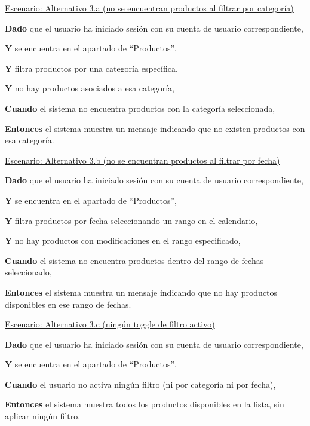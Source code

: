 
\underline{Escenario: Alternativo 3.a (no se encuentran productos al filtrar por categoría)}\par
\vspace{0.15cm}
\textbf{Dado} que el usuario ha iniciado sesión con su cuenta de usuario correspondiente,\par
\textbf{Y} se encuentra en el apartado de \enquote{Productos},\par
\textbf{Y} filtra productos por una categoría específica,\par
\textbf{Y} no hay productos asociados a esa categoría,\par
\textbf{Cuando} el sistema no encuentra productos con la categoría seleccionada,\par
\textbf{Entonces} el sistema muestra un mensaje indicando que no existen productos con esa categoría.\par

\vspace{0.20cm}

\underline{Escenario: Alternativo 3.b (no se encuentran productos al filtrar por fecha)}\par
\vspace{0.15cm}
\textbf{Dado} que el usuario ha iniciado sesión con su cuenta de usuario correspondiente,\par
\textbf{Y} se encuentra en el apartado de \enquote{Productos},\par
\textbf{Y} filtra productos por fecha seleccionando un rango en el calendario,\par
\textbf{Y} no hay productos con modificaciones en el rango especificado,\par
\textbf{Cuando} el sistema no encuentra productos dentro del rango de fechas seleccionado,\par
\textbf{Entonces} el sistema muestra un mensaje indicando que no hay productos disponibles en ese rango de fechas.\par

\vspace{0.20cm}

\underline{Escenario: Alternativo 3.c (ningún toggle de filtro activo)}\par
\vspace{0.15cm}
\textbf{Dado} que el usuario ha iniciado sesión con su cuenta de usuario correspondiente,\par
\textbf{Y} se encuentra en el apartado de \enquote{Productos},\par
\textbf{Cuando} el usuario no activa ningún filtro (ni por categoría ni por fecha),\par
\textbf{Entonces} el sistema muestra todos los productos disponibles en la lista, sin aplicar ningún filtro.\par

